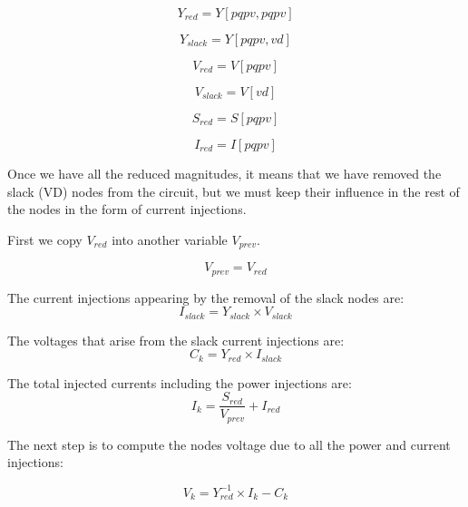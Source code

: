 \documentclass[a4paper,twoside,fleqn]{tufte-book}
\begin{document}
\begin{equation}
Y_{red} = Y[pqpv, pqpv]
\end{equation}

\begin{equation}
Y_{slack} = Y[pqpv, vd]
\end{equation}

\begin{equation}
V_{red} = V[pqpv]
\end{equation}

\begin{equation}
V_{slack} = V[vd]
\end{equation}

\begin{equation}
S_{red} = S[pqpv]
\end{equation}

\begin{equation}
I_{red} = I[pqpv]
\end{equation}

Once we have all the reduced magnitudes, it means that we have removed the slack (VD) nodes from the circuit, but we must keep their influence in the rest of the nodes in the form of current injections.

First we copy $V_{red}$ into another variable $V_{prev}$.

\begin{equation}
V_{prev} = V_{red}
\end{equation}

The current injections appearing by the removal of the slack nodes are:
\begin{equation}
I_{slack} = Y_{slack} \times V_{slack}
\end{equation}

The voltages that arise from the slack current injections are:
\begin{equation}
C_k = Y_{red} \times I_{slack}
\end{equation}

The total injected currents including the power injections are:
\begin{equation}
I_k = \frac{S_{red}}{V_{prev}} + I_{red}
\label{eq:zm_ik}
\end{equation}

The next step is to compute the nodes voltage due to all the power and current injections:

\begin{equation}
V_k = Y_{red}^{-1} \times I_k - C_k
\end{equation}
\end{document}
